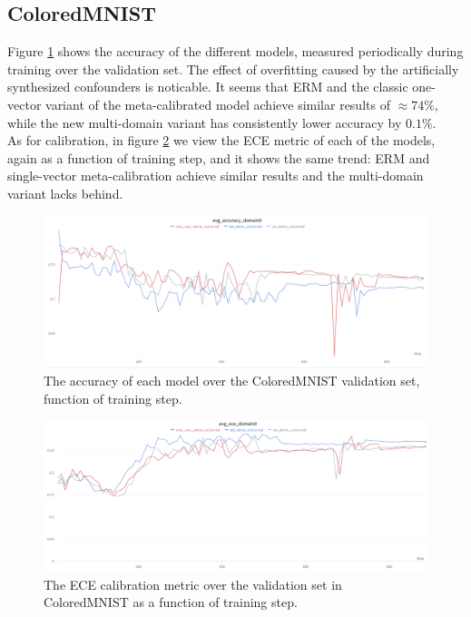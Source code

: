 \documentclass[12pt,a4paper]{article}
\begin{document}
	\subsection{ColoredMNIST}
		Figure \ref{fig:colored_avg_acc} shows the accuracy of the different models, measured periodically during training over the validation set. The effect of overfitting caused by the artificially synthesized confounders is noticable. It seems that ERM and the classic one-vector variant of the meta-calibrated model achieve similar results of $\approx 74\%$, while the new multi-domain variant has consistently lower accuracy by $0.1\%$.\\
		As for calibration, in figure \ref{fig:colored_ece} we view the ECE metric of each of the models, again as a function of training step, and it shows the same trend: ERM and single-vector meta-calibration achieve similar results and the multi-domain variant lacks behind.
		
		\begin{figure}[h]
			\centering
			\includegraphics[width=1\linewidth]{images/results/avg_acc_val_colored}
			\caption{The accuracy of each model over the ColoredMNIST validation set, function of training step.}
			\label{fig:colored_avg_acc}
		\end{figure}
		\begin{figure}[h]
			\centering
			\includegraphics[width=1\linewidth]{images/results/avg_ece_val_colored}
			\caption{The ECE calibration metric over the validation set in ColoredMNIST as a function of training step.}
			\label{fig:colored_ece}
		\end{figure}
	
\end{document}
